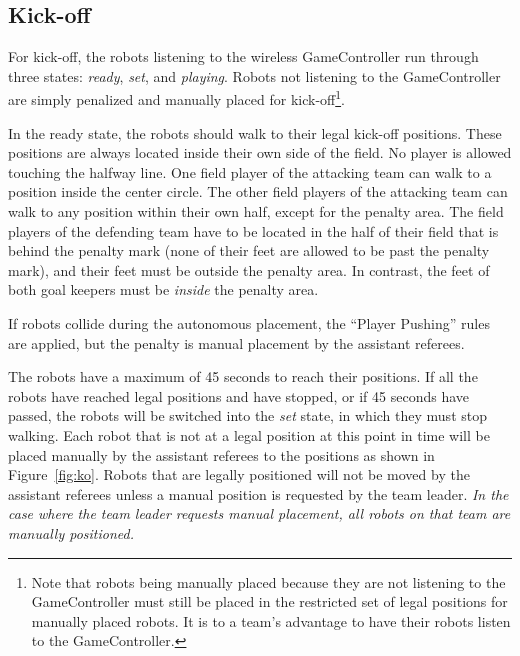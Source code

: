 \documentclass[12pt]{article}
\newcommand{\KickOffAutoTime}{45 seconds\xspace}
\begin{document}
\subsection{Kick-off}
\label{sec:kick-off}

For kick-off, the robots listening to the wireless GameController run through three states: \emph{ready}, \emph{set}, and \emph{playing}. Robots not listening to the GameController are simply penalized and manually placed for kick-off\footnote{Note that robots being manually placed because they are not listening to the GameController must still be placed in the restricted set of legal positions for manually placed robots. It is to a team's advantage to have their robots listen to the GameController.}.

In the ready state, the robots should walk to their legal kick-off positions. These positions are always located inside their own side of the field. No player is allowed touching the halfway line.
One field player of the attacking team can walk to a position inside the center circle.
The other field players of the attacking team can walk to any position within their own half, except for the penalty area.
The field players of the defending team have to be located in the half of their field that is behind the penalty mark (none of their feet are allowed to be past the penalty mark), and their feet must be outside the penalty area.
In contrast, the feet of both goal keepers must be \emph{inside} the penalty area.

If robots collide during the autonomous placement, the ``Player Pushing'' rules are applied, but the penalty is manual placement by the assistant referees.

The robots have a maximum of \KickOffAutoTime to reach their positions. If all the robots have reached legal positions and have stopped, or if \KickOffAutoTime have passed, the robots will be switched into the \emph{set} state, in which they must stop walking. Each robot that is not at a legal position at this point in time will be placed manually by the assistant referees to the positions as shown in Figure~\ref{fig:ko}. Robots that are legally positioned will not be moved by the assistant referees unless a manual position is requested by the team leader.
\emph{In the case where the team leader requests manual placement, all robots on that team are manually positioned.}
\end{document}
